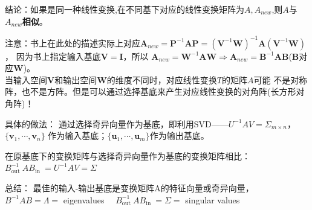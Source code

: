 结论：如果是同一种线性变换,在不同基下对应的线性变换矩阵为$A,A_{new}$,则$A$与$A_{new}$\textbf{相似}。

注意：书上在此处的描述实际上对应$\boldsymbol{A}_{new}= \boldsymbol{P}^{-1}\boldsymbol{AP}
= (\boldsymbol{V}^{-1}\boldsymbol{W})^{-1}\boldsymbol{A}(\boldsymbol{V}^{-1}\boldsymbol{W})$，
因为书上指定输入基底$\boldsymbol{V=I}$，所以
$\boldsymbol{A}_{new}= \boldsymbol{W}^{-1}\boldsymbol{A}\boldsymbol{W}
\Rightarrow \boldsymbol{A}_{new}= \boldsymbol{B}^{-1}\boldsymbol{A}\boldsymbol{B}
$($\boldsymbol{B}$对应$\boldsymbol{W}$)。
\hspace*{\fill} \\

当输入空间$\boldsymbol{V}$和输出空间$\boldsymbol{W}$的维度不同时，对应线性变换$T$的矩阵$A$可能
不是对称阵，也不是方阵。但是可以通过选择基底来产生对应线性变换的对角阵(长方形对角阵)！

具体的做法：
通过选择奇异向量作为基底，即利用SVD——$U^{-1}AV=\Sigma_{m\times n}$，$\{\boldsymbol{v}_1,\cdots,\boldsymbol{v}_n\}$
作为输入基底；$\{\boldsymbol{u}_1,\cdots,\boldsymbol{u}_m\}$作为输出基底。

在原基底下的变换矩阵与选择奇异向量作为基底的变换矩阵相比：
$B_{\text {out }}^{-1} A B_{\text {in }}=U^{-1} A V=\Sigma$

总结：
最佳的输入-输出基底是变换矩阵A的特征向量或奇异向量，
$B^{-1} A B=\Lambda=$ eigenvalues $\quad B_{\text {out }}^{-1} A B_{\text {in }}=\Sigma=$ singular values
